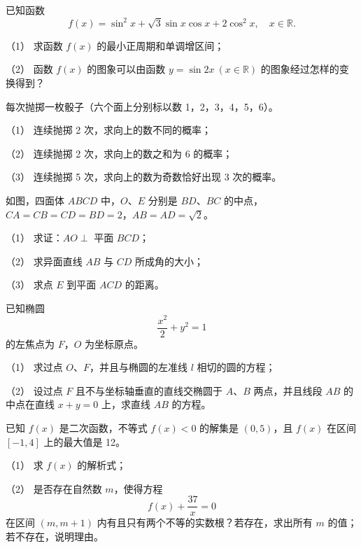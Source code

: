 \begin{question}
已知函数
\nopagebreak[4]
\[
f(x)=\sin^2 x+\sqrt{3}\sin x\cos x+2\cos^2 x,\quad x\in\mathbb{R}.
\]

（1） 求函数 $f(x)$ 的最小正周期和单调增区间；

（2） 函数 $f(x)$ 的图象可以由函数 $y=\sin 2x\ (x\in\mathbb{R})$ 的图象经过怎样的变换得到？

\end{question}
\begin{question}
每次抛掷一枚骰子（六个面上分别标以数 1，2，3，4，5，6）。

（1） 连续抛掷 2 次，求向上的数不同的概率；

（2） 连续抛掷 2 次，求向上的数之和为 6 的概率；

（3） 连续抛掷 5 次，求向上的数为奇数恰好出现 3 次的概率。

\Needspace{0.4\textheight}
\end{question}
\begin{question}
如图，四面体 $ABCD$ 中，$O$、$E$ 分别是 $BD$、$BC$ 的中点，$CA=CB=CD=BD=2$，$AB=AD=\sqrt{2}$。

（1） 求证：$AO\perp$ 平面 $BCD$；

（2） 求异面直线 $AB$ 与 $CD$ 所成角的大小；

（3） 求点 $E$ 到平面 $ACD$ 的距离。
\nopagebreak[4]
\begin{center}\end{center}
\nopagebreak[4]
\Needspace{0.4\textheight}
\end{question}
\begin{question}
已知椭圆
\nopagebreak[4]
\[
\frac{x^2}{2}+y^2=1
\]
的左焦点为 $F$，$O$ 为坐标原点。

（1） 求过点 $O$、$F$，并且与椭圆的左准线 $l$ 相切的圆的方程；

（2） 设过点 $F$ 且不与坐标轴垂直的直线交椭圆于 $A$、$B$ 两点，并且线段 $AB$ 的中点在直线 $x+y=0$ 上，求直线 $AB$ 的方程。
\nopagebreak[4]
\begin{center}\end{center}
\nopagebreak[4]
\end{question}
\begin{question}
已知 $f(x)$ 是二次函数，不等式 $f(x)<0$ 的解集是 $(0,5)$，且 $f(x)$ 在区间 $[-1,4]$ 上的最大值是 12。

（1） 求 $f(x)$ 的解析式；

（2） 是否存在自然数 $m$，使得方程
\nopagebreak[4]
\[
f(x)+\frac{37}{x}=0
\]
在区间 $(m,m+1)$ 内有且只有两个不等的实数根？若存在，求出所有 $m$ 的值；若不存在，说明理由。

\end{question}
